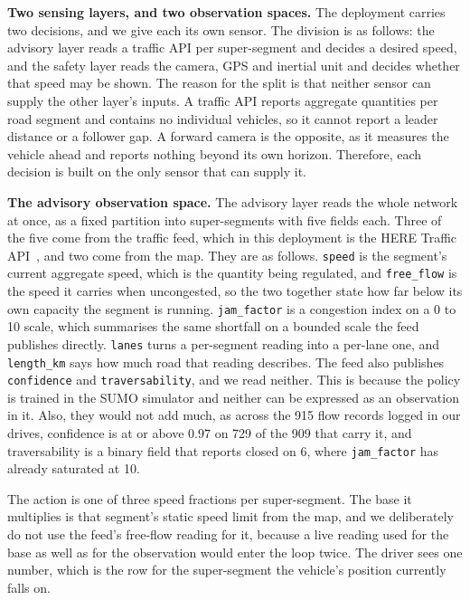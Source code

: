 \noindent\textbf{Two sensing layers, and two observation spaces.} The deployment carries two decisions, and we give each its own sensor. The division is as follows: the advisory layer reads a traffic API per super-segment and decides a desired speed, and the safety layer reads the camera, GPS and inertial unit and decides whether that speed may be shown. The reason for the split is that neither sensor can supply the other layer's inputs. A traffic API reports aggregate quantities per road segment and contains no individual vehicles, so it cannot report a leader distance or a follower gap. A forward camera is the opposite, as it measures the vehicle ahead and reports nothing beyond its own horizon. Therefore, each decision is built on the only sensor that can supply it.

\noindent\textbf{The advisory observation space.} The advisory layer reads the whole network at once, as a fixed partition into super-segments with five fields each. Three of the five come from the traffic feed, which in this deployment is the HERE Traffic API~\cite{here_traffic_api}, and two come from the map. They are as follows. \texttt{speed} is the segment's current aggregate speed, which is the quantity being regulated, and \texttt{free\_flow} is the speed it carries when uncongested, so the two together state how far below its own capacity the segment is running. \texttt{jam\_factor} is a congestion index on a 0 to 10 scale, which summarises the same shortfall on a bounded scale the feed publishes directly. \texttt{lanes} turns a per-segment reading into a per-lane one, and \texttt{length\_km} says how much road that reading describes. The feed also publishes \texttt{confidence} and \texttt{traversability}, and we read neither. This is because the policy is trained in the SUMO simulator and neither can be expressed as an observation in it. Also, they would not add much, as across the 915 flow records logged in our drives, confidence is at or above $0.97$ on 729 of the 909 that carry it, and traversability is a binary field that reports closed on 6, where \texttt{jam\_factor} has already saturated at 10.

The action is one of three speed fractions per super-segment. The base it multiplies is that segment's static speed limit from the map, and we deliberately do not use the feed's free-flow reading for it, because a live reading used for the base as well as for the observation would enter the loop twice. The driver sees one number, which is the row for the super-segment the vehicle's position currently falls on.

